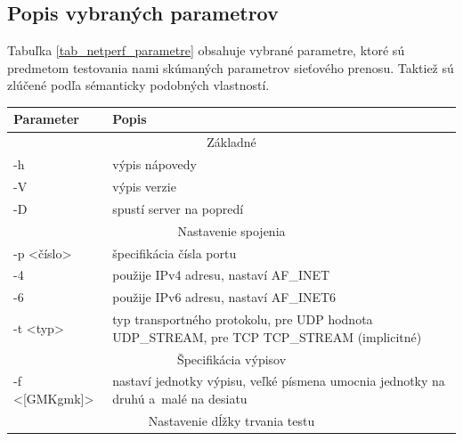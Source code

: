 \newpage

        \subsection{Popis vybraných parametrov} \label{netperf_param}
        Tabuľka \ref{tab_netperf_parametre} obsahuje vybrané parametre, ktoré sú
        predmetom testovania nami skúmaných parametrov sieťového prenosu. Taktiež sú zlúčené 
        podľa sémanticky podobných vlastností.

        \begin{table}[H]
            \begin{center}
                \begin{tabular}{|l|p{11cm}|}
                    \hline
                     \textbf{Parameter}  &  \textbf{Popis}  \\
                    \hline
                    \multicolumn{2}{|c|}{Základné} \\
                    \hline
                    -h  &  výpis nápovedy \\ 
                    -V  &  výpis verzie  \\
                    -D  &  spustí server na popredí \\
                    \hline
                    \multicolumn{2}{|c|}{Nastavenie spojenia} \\
                    \hline
                    -p \textless číslo\textgreater &  
                        špecifikácia čísla portu\\ 
                    -4   &  použije IPv4 adresu, nastaví AF\_INET \\
                    -6   &  použije IPv6 adresu, nastaví AF\_INET6 \\
                    -t \textless typ\textgreater  & 
                           typ transportného protokolu, pre UDP hodnota
                           UDP\_STREAM, pre TCP TCP\_STREAM (implicitné)\\
                    \hline
                    \multicolumn{2}{|c|}{Špecifikácia výpisov} \\
                    \hline
                    -f \textless [GMKgmk]\textgreater & 
                        nastaví jednotky výpisu, veľké písmena umocnia
                        jednotky na druhú a~malé na desiatu\\
                    \hline
                    \multicolumn{2}{|c|}{Nastavenie dĺžky trvania testu} \\

\end{tabular}
\end{center}
\end{table}
